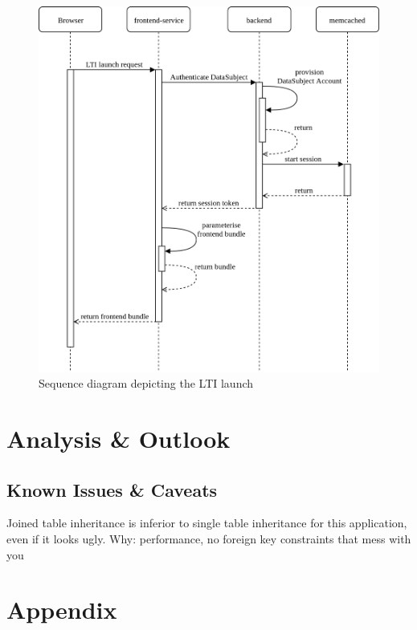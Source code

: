 \documentclass[a4paper,11pt]{article}
\begin{document}
            \begin{figure}
                \centering
                \includegraphics[width=\textwidth]{lti-launch}
                \caption{Sequence diagram depicting the LTI launch}
                \label{fig:lti-launch}
            \end{figure}
            
        
        \section{Analysis \& Outlook}
            \subsection{Known Issues \& Caveats}
                Joined table inheritance is inferior to single table inheritance
                for this application, even if it looks ugly. Why: performance,
                no foreign key constraints that mess with you



        \pagebreak
        \section{Appendix}
\end{document}
